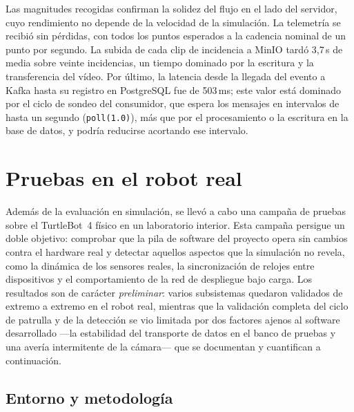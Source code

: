 Las magnitudes recogidas confirman la solidez del flujo en el lado del servidor, cuyo rendimiento
no depende de la velocidad de la simulación. La telemetría se recibió sin pérdidas, con todos los
puntos esperados a la cadencia nominal de un punto por segundo. La subida de cada clip de
incidencia a MinIO tardó 3,7\,s de media sobre veinte incidencias, un tiempo dominado por la
escritura y la transferencia del vídeo. Por último, la latencia desde la llegada del evento a
Kafka hasta su registro en PostgreSQL fue de 503\,ms; este valor está dominado por el ciclo de
sondeo del consumidor, que espera los mensajes en intervalos de hasta un segundo
(\texttt{poll(1.0)}), más que por el procesamiento o la escritura en la base de datos, y podría
reducirse acortando ese intervalo.

\section{Pruebas en el robot real}
\label{sec:pruebas-real}

Además de la evaluación en simulación, se llevó a cabo una campaña de pruebas sobre el
\mbox{TurtleBot~4} físico en un laboratorio interior. Esta campaña persigue un doble
objetivo: comprobar que la pila de software del proyecto opera sin cambios contra el
hardware real y detectar aquellos aspectos que la simulación no revela, como la dinámica de
los sensores reales, la sincronización de relojes entre dispositivos y el comportamiento de
la red de despliegue bajo carga. Los resultados son de carácter \emph{preliminar}: varios
subsistemas quedaron validados de extremo a extremo en el robot real, mientras que la
validación completa del ciclo de patrulla y de la detección se vio limitada por dos factores
ajenos al software desarrollado —la estabilidad del transporte de datos en el banco de
pruebas y una avería intermitente de la cámara— que se documentan y cuantifican a
continuación.

\subsection{Entorno y metodología}
\label{sec:real-entorno}


